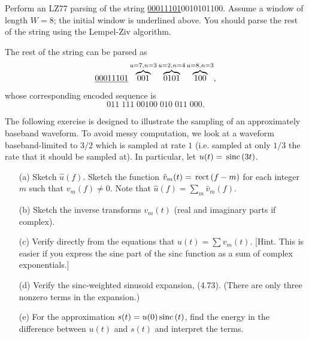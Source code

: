 \documentclass{assignment}
\begin{document}
\begin{prob}[2.33]
    Perform an LZ77 parsing of the string \uline{00011101}0010101100. Assume a window of length $W=8$; the initial window is underlined above. You should parse the rest of the string using the Lempel-Ziv algorithm.
\end{prob}
\begin{sol}
    The rest of the string can be parsed as
    \[
        \uline{00011101}\overbrace{001}^{u=7,n=3}\overbrace{0101}^{u=2,n=4}\overbrace{100}^{u=8,n=3},
    \]
    whose corresponding encoded sequence is
    \[
        011\;111\;00100\;010\;011\;000.
    \]
\end{sol}

\begin{prob}[4.35 Aliasing]
    The following exercise is designed to illustrate the sampling of an approximately baseband waveform. To avoid messy computation, we look at a waveform baseband-limited to $3/2$ which is sampled at rate $1$ (i.e. sampled at only $1/3$ the rate that it should be sampled at). In particular, let $u(t)=\,\text{sinc}\,(3t)$.
    \begin{itemize}
        \item[(a)] Sketch $\hat{u}(f)$. Sketch the function $\hat{v}_m(t)=\,\text{rect}\,(f-m)$ for each integer $m$ such that $v_m(f)\neq 0$. Note that $\hat{u}(f)=\sum_m\hat{v}_m(f)$.
        \item[(b)] Sketch the inverse transforms $v_m(t)$ (real and imaginary parts if complex).
        \item[(c)] Verify directly from the equations that $u(t)=\sum v_m(t)$. [Hint. This is easier if you express the sine part of the sinc function as a sum of complex exponentials.]
        \item[(d)] Verify the sinc-weighted sinusoid expansion, (4.73). (There are only three nonzero terms in the expansion.)
        \item[(e)] For the approximation $s(t)=u(0)\,\text{sinc}\,(t)$, find the energy in the difference between $u(t)$ and $s(t)$ and interpret the terms.
    \end{itemize}
\end{prob}
\begin{sol}
\end{sol}
\end{document}
